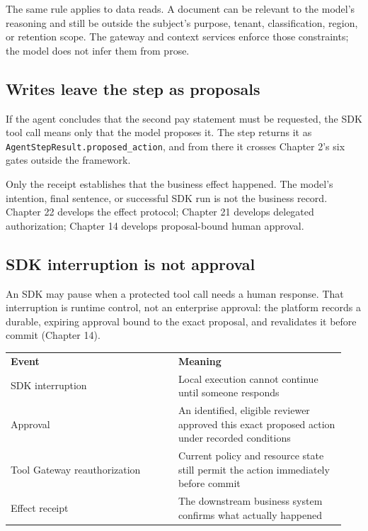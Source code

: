 The same rule applies to data reads. A document can be relevant to the model’s reasoning and still be outside the subject’s purpose, tenant, classification, region, or retention scope. The gateway and context services enforce those constraints; the model does not infer them from prose.\par

\subsection{Writes leave the step as proposals}

If the agent concludes that the second pay statement must be requested, the SDK tool call means only that the model proposes it. The step returns it as \lstinline[style=bookinline]!AgentStepResult.proposed_action!, and from there it crosses Chapter 2's six gates outside the framework.\par

Only the receipt establishes that the business effect happened. The model’s intention, final sentence, or successful SDK run is not the business record. Chapter 22 develops the effect protocol; Chapter 21 develops delegated authorization; Chapter 14 develops proposal-bound human approval.\par

\subsection{SDK interruption is not approval}

An SDK may pause when a protected tool call needs a human response. That interruption is runtime control, not an enterprise approval: the platform records a durable, expiring approval bound to the exact proposal, and revalidates it before commit (Chapter 14).\par

\BookTableStart
\small
\begin{tabular}{@{}Y{0.4700\linewidth}Y{0.4700\linewidth}@{}}
\color{white}\bfseries Event & \color{white}\bfseries Meaning \\
SDK interruption & Local execution cannot continue until someone responds \\
Approval & An identified, eligible reviewer approved this exact proposed action under recorded conditions \\
Tool Gateway reauthorization & Current policy and resource state still permit the action immediately before commit \\
Effect receipt & The downstream business system confirms what actually happened \\
\end{tabular}
\BookTableEnd

